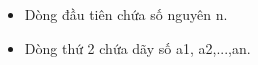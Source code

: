 \begin{itemize}
	\item     Dòng đầu tiên chứa số nguyên n.   
	\item     Dòng thứ 2 chứa dãy số a1, a2,...,an.   
\end{itemize}

\